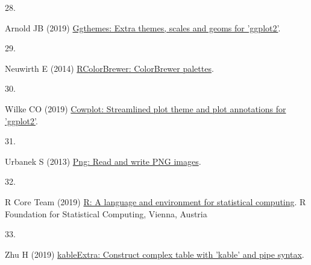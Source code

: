 \documentclass[conference,final,]{IEEEtran}
\newlength{\cslhangindent}
\newlength{\csllabelwidth}
\newlength{\cslentryspacingunit} %
\newenvironment{CSLReferences}[2] %
 {%
  \setlength{\parindent}{0pt}
  \ifodd #1
  \let\oldpar\par
  \def\par{\hangindent=\cslhangindent\oldpar}
  \fi
  \setlength{\parskip}{#2\cslentryspacingunit}
 }%
 {}
\newcommand{\CSLLeftMargin}[1]{\parbox[t]{\csllabelwidth}{#1}}
\newcommand{\CSLRightInline}[1]{\parbox[t]{\linewidth - \csllabelwidth}{#1}\break}
\begin{document}
\begin{CSLReferences}{0}{0}
\leavevmode{}%
\CSLLeftMargin{28. }%
\CSLRightInline{Arnold JB (2019) \href{https://CRAN.R-project.org/package=ggthemes}{Ggthemes: Extra themes, scales and geoms for 'ggplot2'}. }

\leavevmode{}%
\CSLLeftMargin{29. }%
\CSLRightInline{Neuwirth E (2014) \href{https://CRAN.R-project.org/package=RColorBrewer}{RColorBrewer: ColorBrewer palettes}. }

\leavevmode{}%
\CSLLeftMargin{30. }%
\CSLRightInline{Wilke CO (2019) \href{https://CRAN.R-project.org/package=cowplot}{Cowplot: Streamlined plot theme and plot annotations for 'ggplot2'}. }

\leavevmode{}%
\CSLLeftMargin{31. }%
\CSLRightInline{Urbanek S (2013) \href{https://CRAN.R-project.org/package=png}{Png: Read and write PNG images}. }

\leavevmode{}%
\CSLLeftMargin{32. }%
\CSLRightInline{R Core Team (2019) \href{https://www.R-project.org/}{R: A language and environment for statistical computing}. R Foundation for Statistical Computing, Vienna, Austria}

\leavevmode{}%
\CSLLeftMargin{33. }%
\CSLRightInline{Zhu H (2019) \href{https://CRAN.R-project.org/package=kableExtra}{kableExtra: Construct complex table with 'kable' and pipe syntax}. }

\end{CSLReferences}
\end{document}
